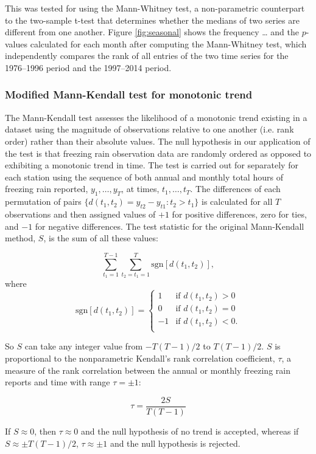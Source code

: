 \documentclass[twocol]{ametsoc}
\begin{document}
This was tested for using the Mann-Whitney test, a non-parametric counterpart to the two-sample t-test that determines whether the medians of two series are different from one another. Figure \ref{fig:seasonal} shows the frequency … and the $p$-values calculated for each month after computing the Mann-Whitney test, which independently compares the rank of all entries of the two time series for the 1976--1996 period and the 1997--2014 period.


\subsubsection{Modified Mann-Kendall test for monotonic trend}
The Mann-Kendall test assesses the likelihood of a monotonic trend existing in a dataset using the magnitude of observations relative to one another (i.e. rank order) rather than their absolute values. The null hypothesis in our application of the test is that freezing rain observation data are randomly ordered as opposed to exhibiting a monotonic trend in time. The test is carried out for separately for each station using the sequence of both annual and monthly total hours of freezing rain reported, $y_1,\ldots,y_T$, at times, $t_1,\ldots,t_T$. The differences of each permutation of pairs $\{d(t_1,t_2)=y_{t2}-y_{t1}:t_2>t_1\}$ is calculated for all $T$ observations and then assigned values of $+1$ for positive differences, zero for ties, and $-1$ for negative differences. The test statistic for the original Mann-Kendall method, $S$, is the sum of all these values:

\[\sum_{t_1=1}^{T-1}\sum_{t_2=t_1=1}^T\text{sgn}[d(t_1,t_2)],\] where\\

\[\text{sgn}[d(t_1,t_2)]=\begin{cases} 1 & \text{if } d(t_1,t_2)>0\\ 0 & \text{if } d(t_1,t_2)=0\\ -1 & \text{if } d(t_1,t_2)<0.\\ \end{cases}\]

So $S$ can take any integer value from $-T(T-1)/2$ to $T(T-1)/2$. $S$ is proportional to the nonparametric Kendall's rank correlation coefficient, $\tau$, a measure of the rank correlation between the annual or monthly freezing rain reports and time with range $\tau=\pm1$:

\[\tau=\frac{2S}{T(T-1)}\]

If $S\approx0$, then $\tau\approx0$ and the null hypothesis of no trend is accepted, whereas if  $S\approx\pm T(T-1)/2$, $\tau\approx\pm1$ and the null hypothesis is rejected. 
\end{document}

